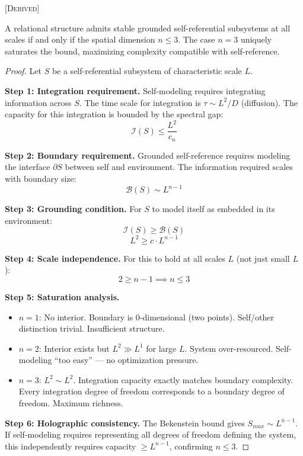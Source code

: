 \begin{theorem} \label{thm:dimension}
\textsc{[Derived]}

A relational structure admits stable grounded self-referential subsystems at all scales if and only if the spatial dimension $n \leq 3$. The case $n = 3$ uniquely saturates the bound, maximizing complexity compatible with self-reference.
\end{theorem}

\begin{proof}
Let $S$ be a self-referential subsystem of characteristic scale $L$.

\textbf{Step 1: Integration requirement.}
Self-modeling requires integrating information across $S$. The time scale for integration is $\tau \sim L^2 / D$ (diffusion). The capacity for this integration is bounded by the spectral gap:
\[
\mathcal{I}(S) \leq \frac{L^2}{c_n}
\]

\textbf{Step 2: Boundary requirement.}
Grounded self-reference requires modeling the interface $\partial S$ between self and environment. The information required scales with boundary size:
\[
\mathcal{B}(S) \sim L^{n-1}
\]

\textbf{Step 3: Grounding condition.}
For $S$ to model itself as embedded in its environment:
\[
\mathcal{I}(S) \geq \mathcal{B}(S)
\]
\[
L^2 \geq c \cdot L^{n-1}
\]

\textbf{Step 4: Scale independence.}
For this to hold at all scales $L$ (not just small $L$):
\[
2 \geq n - 1 \implies n \leq 3
\]

\textbf{Step 5: Saturation analysis.}
\begin{itemize}
    \item $n = 1$: No interior. Boundary is 0-dimensional (two points). Self/other distinction trivial. Insufficient structure.
    \item $n = 2$: Interior exists but $L^2 \gg L^1$ for large $L$. System over-resourced. Self-modeling ``too easy'' — no optimization pressure.
    \item $n = 3$: $L^2 \sim L^2$. Integration capacity exactly matches boundary complexity. Every integration degree of freedom corresponds to a boundary degree of freedom. Maximum richness.
\end{itemize}

\textbf{Step 6: Holographic consistency.}
The Bekenstein bound gives $S_{max} \sim L^{n-1}$. If self-modeling requires representing all degrees of freedom defining the system, this independently requires capacity $\geq L^{n-1}$, confirming $n \leq 3$.
\end{proof}

